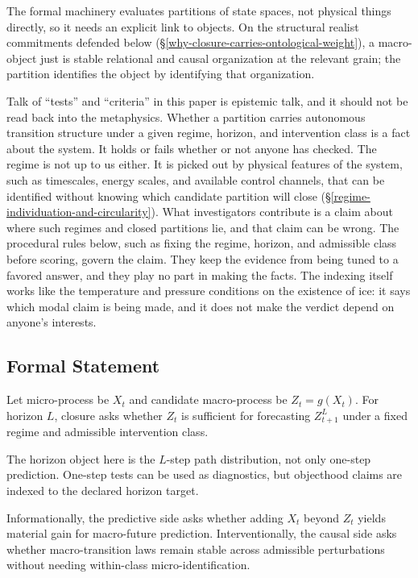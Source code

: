The formal machinery evaluates partitions of state spaces, not physical
things directly, so it needs an explicit link to objects. On the
structural realist commitments defended below
(\S\ref{why-closure-carries-ontological-weight}), a macro-object just is
stable relational and causal organization at the relevant grain; the
partition identifies the object by identifying that organization.

Talk of ``tests'' and ``criteria'' in this paper is epistemic talk, and
it should not be read back into the metaphysics. Whether a partition
carries autonomous transition structure under a given regime, horizon,
and intervention class is a fact about the system. It holds or fails
whether or not anyone has checked. The regime is not up to us either.
It is picked out by physical features of the system, such as
timescales, energy scales, and available control channels, that can be
identified without knowing which candidate partition will close
(\S\ref{regime-individuation-and-circularity}). What investigators
contribute is a claim about where such regimes and closed partitions
lie, and that claim can be wrong. The procedural rules below, such as
fixing the regime, horizon, and admissible class before scoring, govern
the claim. They keep the evidence from being tuned to a favored answer,
and they play no part in making the facts. The indexing itself works
like the temperature and pressure conditions on the existence of ice:
it says which modal claim is being made, and it does not make the
verdict depend on anyone's interests.

\subsection{Formal Statement}\label{formal-statement}

Let micro-process be \(X_t\) and candidate macro-process be
\(Z_t = g(X_t)\). For horizon \(L\), closure asks whether \(Z_t\) is
sufficient for forecasting \(Z_{t+1}^{L}\) under a fixed regime and
admissible intervention class.

The horizon object here is the \(L\)-step path distribution, not only
one-step prediction. One-step tests can be used as diagnostics, but
objecthood claims are indexed to the declared horizon target.

Informationally, the predictive side asks whether adding \(X_t\) beyond
\(Z_t\) yields material gain for macro-future prediction.
Interventionally, the causal side asks whether macro-transition laws
remain stable across admissible perturbations without needing
within-class micro-identification.

